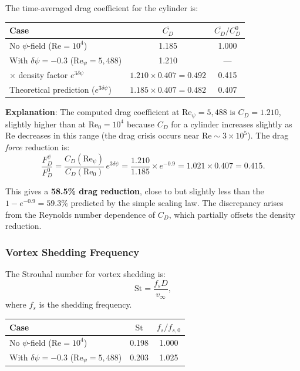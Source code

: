 \documentclass[12pt,twocolumn]{article}
\newcommand{\Rey}{\mathrm{Re}}
\newcommand{\Str}{\mathrm{St}}
\newcommand{\dpsi}{\delta\psi}
\begin{document}
The time-averaged drag coefficient for the cylinder is:
\begin{center}
\begin{tabular}{@{}lcc@{}}
\toprule
\textbf{Case} & $\overline{C_D}$ & $\overline{C_D}/C_D^0$ \\
\midrule
No $\psi$-field ($\Rey = 10^4$) & 1.185 & 1.000 \\
With $\dpsi = -0.3$ ($\Rey_\psi = 5{,}488$) & 1.210 & --- \\
\quad $\times$ density factor $e^{3\dpsi}$ & $1.210 \times 0.407 = 0.492$ & 0.415 \\
\midrule
Theoretical prediction ($e^{3\dpsi}$) & $1.185 \times 0.407 = 0.482$ & 0.407 \\
\bottomrule
\end{tabular}
\end{center}

\textbf{Explanation}: The computed drag coefficient at $\Rey_\psi = 5{,}488$
is $C_D = 1.210$, slightly higher than at $\Rey_0 = 10^4$ because $C_D$
for a cylinder increases slightly as $\Rey$ decreases in this range (the
drag crisis occurs near $\Rey \sim 3\times10^5$). The drag \emph{force}
reduction is:
\begin{equation}
\frac{F_D^\psi}{F_D^0} = \frac{C_D(\Rey_\psi)}{C_D(\Rey_0)}\,e^{3\dpsi}
= \frac{1.210}{1.185}\times e^{-0.9} = 1.021 \times 0.407 = 0.415.
\end{equation}

This gives a \textbf{58.5\% drag reduction}, close to but slightly less than
the $1 - e^{-0.9} = 59.3\%$ predicted by the simple scaling law. The
discrepancy arises from the Reynolds number dependence of $C_D$, which
partially offsets the density reduction.

\subsubsection{Vortex Shedding Frequency}

The Strouhal number for vortex shedding is:
\begin{equation}
\Str = \frac{f_s D}{v_\infty},
\end{equation}
where $f_s$ is the shedding frequency.

\begin{center}
\begin{tabular}{@{}lcc@{}}
\toprule
\textbf{Case} & $\Str$ & $f_s/f_{s,0}$ \\
\midrule
No $\psi$-field ($\Rey = 10^4$) & 0.198 & 1.000 \\
With $\dpsi = -0.3$ ($\Rey_\psi = 5{,}488$) & 0.203 & 1.025 \\
\bottomrule
\end{tabular}
\end{center}
\end{document}
